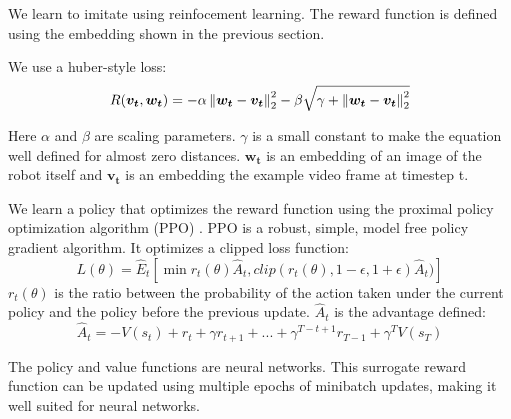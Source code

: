 We learn to imitate using reinfocement learning. The reward function is defined using the embedding shown in the previous section.

We use a huber-style loss: \[
    R(\boldsymbol{v_t}, \boldsymbol{w_t}) = -\alpha \left\lVert\boldsymbol{w_t} - \boldsymbol{v_t}\right\rVert^2_2 -\beta \sqrt{\gamma + \left\lVert\boldsymbol{w_t} - \boldsymbol{v_t}\right\rVert^2_2}
\]

Here $\alpha$ and $\beta$ are scaling parameters. $\gamma$ is a small constant to make the equation well defined for almost zero distances. $\boldsymbol{w_t}$ is an embedding of an image of the robot itself and $\boldsymbol{v_t}$ is an embedding the example video frame at timestep t.

We learn a policy that optimizes the reward function using the proximal policy optimization algorithm (PPO) \citep{ppo}. PPO is a robust, simple, model free policy gradient algorithm. It optimizes a clipped loss function: \[
    L(\theta) = \hat{E}_t[\min{r_t(\theta)\hat{A}_t, clip(r_t(\theta), 1 - \epsilon, 1 + \epsilon)\hat{A}_t})]
\]
$r_t(\theta)$ is the ratio between the probability of the action taken under the current policy and the policy before the previous update. $\hat{A}_t$ is the advantage defined: \[
    \hat{A}_t = -V(s_t) + r_t + \gamma r_{t+1} + ... + \gamma^{T-t+1}r_{T-1} + \gamma^T V(s_T)
    \]

The policy and value functions are neural networks. This surrogate reward function can be updated using multiple epochs of minibatch updates, making it well suited for neural networks. \citep{ppo}


